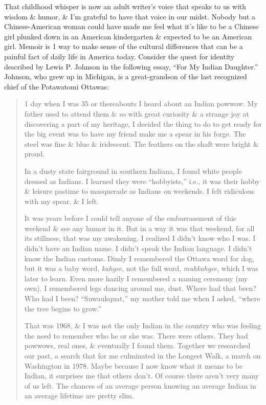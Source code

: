 \documentclass{article}
\begin{document}
That childhood whisper is now an adult writer's voice that speaks to us with wisdom \& humor, \& I'm grateful to have that voice in our midst. Nobody but a Chinese-American woman could have made me feel what it's like to be a Chinese girl plunked down in an American kindergarten \& expected to be an American girl. Memoir is 1 way to make sense of the cultural differences that can be a painful fact of daily life in America today. Consider the quest for identity described by Lewis P. Johnson in the following essay, ``For My Indian Daughter.'' Johnson, who grew up in Michigan, is a great-grandson of the last recognized chief of the Potawatomi Ottawas:
\begin{quotation}
	1 day when I was 35 or thereabouts I heard about an Indian powwow. My father used to attend them \& so with great curiosity \& a strange joy at discovering a part of my heritage, I decided the thing to do to get ready for the big event was to have my friend make me a spear in his forge. The steel was fine \& blue \& iridescent. The feathers on the shaft were bright \& proud.
	
	In a dusty state fairground in southern Indiana, I found white people dressed as Indians. I learned they were ``hobbyists,'' i.e., it was their hobby \& leisure pastime to masquerade as Indians on weekends. I felt ridiculous with my spear, \& I left.
	
	It was years before I could tell anyone of the embarrassment of this weekend \& see any humor in it. But in a way it was that weekend, for all its stillness, that was my awakening. I realized I didn't know who I was. I didn't have an Indian name. I didn't speak the Indian language. I didn't know the Indian customs. Dimly I remembered the Ottawa word for dog, but it was a baby word, \textit{kahgee}, not the full word, \textit{muhkahgee}, which I was later to learn. Even more hazily I remembered a naming ceremony (my own). I remembered legs dancing around me, dust. Where had that been? Who had I been? ``Suwaukquat,'' my mother told me when I asked, ``where the tree begins to grow.''
	
	That was 1968, \& I was not the only Indian in the country who was feeling the need to remember who he or she was. There were others. They had powwows, real ones, \& eventually I found them. Together we researched our past, a search that for me culminated in the Longest Walk, a march on Washington in 1978. Maybe because I now know what it means to be Indian, it surprises me that others don't. Of course there aren't very many of us left. The chances of an average person knowing an average Indian in an average lifetime are pretty slim.
\end{quotation}
\end{document}
